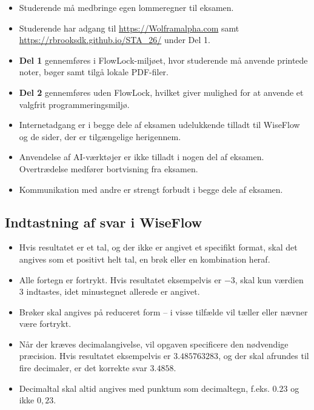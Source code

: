 \documentclass[11pt,english]{article}
\begin{document}
\begin{itemize}
    \item Studerende må medbringe egen lommeregner til eksamen.
    \item Studerende har adgang til \href{https://Wolframalpha.com}{https://Wolframalpha.com} samt \href{https://rbrooksdk.github.io/STA_26/}{https://rbrooksdk.github.io/STA\_26/} under Del 1.
    \item \textbf{Del 1} gennemføres i FlowLock-miljøet, hvor studerende må anvende printede noter, bøger samt tilgå lokale PDF-filer.
    \item \textbf{Del 2} gennemføres uden FlowLock, hvilket giver mulighed for at anvende et valgfrit programmeringsmiljø.
    \item Internetadgang er i begge dele af eksamen udelukkende tilladt til WiseFlow og de sider, der er tilgængelige herigennem.
    \item Anvendelse af AI-værktøjer er ikke tilladt i nogen del af eksamen. Overtrædelse medfører bortvisning fra eksamen.
    \item Kommunikation med andre er strengt forbudt i begge dele af eksamen.
\end{itemize}

\subsection*{Indtastning af svar i WiseFlow}

\begin{itemize}
    \item Hvis resultatet er et tal, og der ikke er angivet et specifikt format, skal det angives som et positivt helt tal, en brøk eller en kombination heraf.
    \item Alle fortegn er fortrykt. Hvis resultatet eksempelvis er \(-3\), skal kun værdien \(3\) indtastes, idet minustegnet allerede er angivet.
    \item Brøker skal angives på reduceret form – i visse tilfælde vil tæller eller nævner være fortrykt.
    \item Når der kræves decimalangivelse, vil opgaven specificere den nødvendige præcision. Hvis resultatet eksempelvis er \(3.485763283\), og der skal afrundes til fire decimaler, er det korrekte svar \(3.4858\).
    \item Decimaltal skal altid angives med punktum som decimaltegn, f.eks. \(0.23\) og ikke \(0,23\).
\end{itemize}
\end{document}
